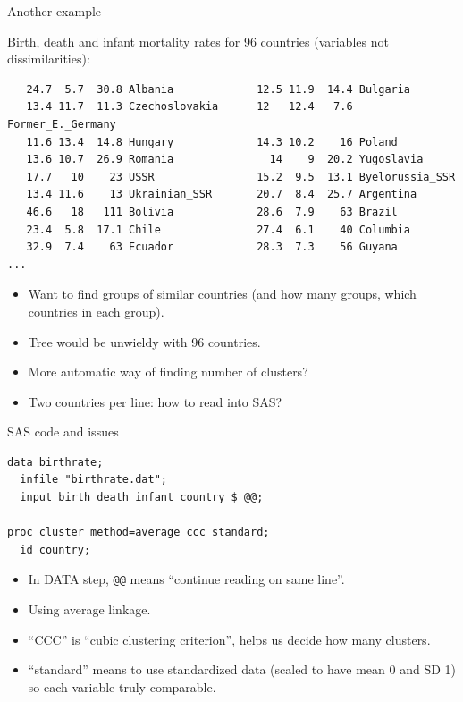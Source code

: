 \documentclass[pdf]{prosper}
\begin{document}
\begin{slide}{Another example}

Birth, death and infant mortality rates for 96 countries (variables not dissimilarities):

{\scriptsize
\begin{verbatim}
   24.7  5.7  30.8 Albania             12.5 11.9  14.4 Bulgaria
   13.4 11.7  11.3 Czechoslovakia      12   12.4   7.6 Former_E._Germany
   11.6 13.4  14.8 Hungary             14.3 10.2    16 Poland
   13.6 10.7  26.9 Romania               14    9  20.2 Yugoslavia
   17.7   10    23 USSR                15.2  9.5  13.1 Byelorussia_SSR
   13.4 11.6    13 Ukrainian_SSR       20.7  8.4  25.7 Argentina
   46.6   18   111 Bolivia             28.6  7.9    63 Brazil
   23.4  5.8  17.1 Chile               27.4  6.1    40 Columbia
   32.9  7.4    63 Ecuador             28.3  7.3    56 Guyana
...
\end{verbatim}
}

\begin{itemize}
\item Want to find groups of similar countries (and how many groups, which countries in each group).
\item Tree would be unwieldy with 96 countries.
\item More automatic way of finding number of clusters?
\item Two countries per line: how to read into SAS?
\end{itemize}
  
\end{slide}

\begin{slide}{SAS code and issues}

\begin{verbatim}
data birthrate;
  infile "birthrate.dat";
  input birth death infant country $ @@;

proc cluster method=average ccc standard;
  id country;
\end{verbatim}

\vspace{3ex}

  \begin{itemize}
  \item In DATA step, \verb=@@= means ``continue reading on same line''.
  \item Using average linkage.
  \item ``CCC'' is ``cubic clustering criterion'', helps us decide how many clusters.
  \item ``standard'' means to use standardized data (scaled to have mean 0 and SD 1) so each variable truly comparable.
  \end{itemize}

  
\end{slide}
\end{document}
